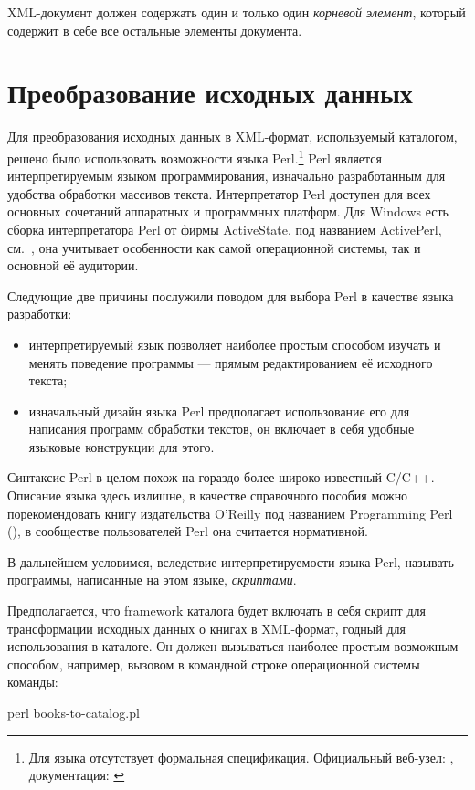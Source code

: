 \documentclass[a4paper,14pt,oneside]{extreport}
\begin{document}
XML-документ должен содержать один и только один \textit{корневой элемент}, который содержит в себе все остальные элементы документа.
	
\section{Преобразование исходных данных}
Для преобразования исходных данных в XML-формат, используемый каталогом, решено было использовать возможности языка Perl.\footnote{Для языка отсутствует формальная спецификация. Официальный веб-узел: \cite{Perl-website}, документация: \cite{Perl-docs}} Perl является интерпретируемым языком программирования, изначально разработанным для удобства обработки массивов текста. Интерпретатор Perl доступен для всех основных сочетаний аппаратных и программных платформ. Для Windows есть сборка интерпретатора Perl от фирмы ActiveState, под названием ActivePerl, см.~\cite{ASPerl-website}, она учитывает особенности как самой операционной системы, так и основной её аудитории. 

Следующие две причины послужили поводом для выбора Perl в качестве языка разработки:
\begin{itemize}
\item интерпретируемый язык позволяет наиболее простым способом изучать и менять поведение программы --- прямым редактированием её исходного текста;
\item изначальный дизайн языка Perl предполагает использование его для написания программ обработки текстов, он включает в себя удобные языковые конструкции для этого.
\end{itemize}

Синтаксис Perl в целом похож на гораздо более широко известный C/C++. Описание языка здесь излишне, в качестве справочного пособия можно порекомендовать книгу издательства O'Reilly под названием Programming Perl (\cite{Perl-o-reilly-book}), в сообществе пользователей Perl она считается нормативной.

В дальнейшем условимся, вследствие интерпретируемости языка Perl, называть программы, написанные на этом языке, \textit{скриптами}.

Предполагается, что framework каталога будет включать в себя скрипт для трансформации исходных данных о книгах в XML-формат, годный для использования в каталоге. Он должен вызываться наиболее простым возможным способом, например, вызовом в командной строке операционной системы команды:
\begin{VerbatimCode}
perl books-to-catalog.pl
\end{VerbatimCode}
\end{document}
